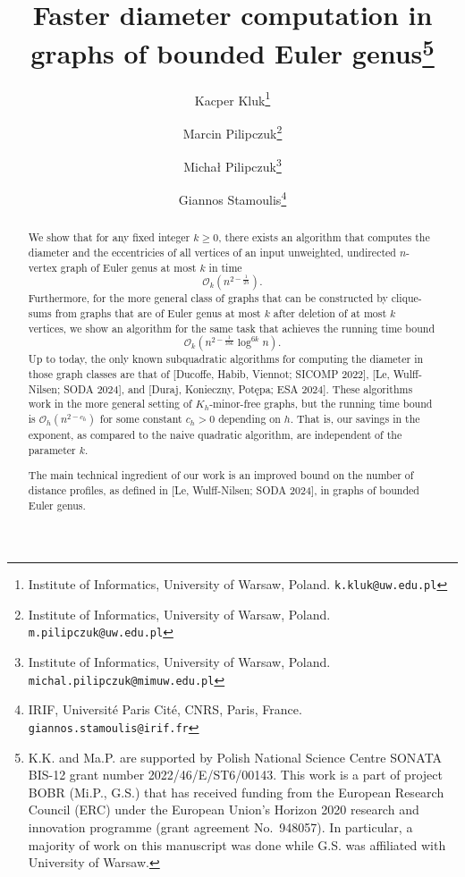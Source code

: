 \documentclass[11pt,a4paper]{article}
\newcommand{\Oh}{\mathcal{O}}
\renewcommand{\geq}{\geqslant}
\begin{document}
\author{
  Kacper Kluk\thanks{Institute of Informatics, University of Warsaw, Poland. \texttt{k.kluk@uw.edu.pl}}
  \and
  Marcin Pilipczuk\thanks{Institute of Informatics, University of Warsaw, Poland. \texttt{m.pilipczuk@uw.edu.pl}}
  \and
  Micha\l{} Pilipczuk\thanks{Institute of Informatics, University of Warsaw, Poland. \texttt{michal.pilipczuk@mimuw.edu.pl}}
  \and
  Giannos Stamoulis\thanks{IRIF, Université Paris Cité, CNRS, Paris, France. \texttt{giannos.stamoulis@irif.fr}}
}


\title{Faster diameter computation in graphs of bounded Euler genus\thanks{
  K.K. and Ma.P. are supported by Polish National Science Centre SONATA BIS-12 grant number 2022/46/E/ST6/00143.
  This work is a part of project BOBR (Mi.P., G.S.) that has received funding from the European Research Council (ERC) 
under the European Union's Horizon 2020 research and innovation programme (grant agreement No.~948057). In particular, a majority of work on this manuscript was done while G.S. was affiliated with University of Warsaw.}}

\date{}

\maketitle

\begin{abstract}
We show that for any fixed integer $k \geq 0$, there exists an algorithm
that computes the diameter and the eccentricies of all vertices of an input
unweighted, undirected $n$-vertex graph of Euler genus at most $k$ in time
 \[ \Oh_k(n^{2-\frac{1}{25}}). \]
Furthermore, for the more general class of graphs
that can be constructed
by clique-sums from graphs that are of Euler genus at most $k$ after deletion
of at most $k$ vertices, we show an algorithm for the same task that achieves the running time bound
 \[ \Oh_k(n^{2-\frac{1}{356}} \log^{6k} n). \]
Up to today, the only known subquadratic algorithms for computing the diameter in those graph classes
are that of [Ducoffe, Habib, Viennot; SICOMP 2022], [Le, Wulff-Nilsen; SODA 2024],
and [Duraj, Konieczny, Pot\k{e}pa; ESA 2024]. These algorithms work
in the more general setting of $K_h$-minor-free graphs,
but the running time bound is $\Oh_h(n^{2-c_h})$ for some constant $c_h > 0$ depending
on $h$. 
That is, our savings in the exponent, as compared to the naive quadratic algorithm, 
are independent of the parameter $k$.

The main technical ingredient of our work is an improved bound on the number of distance
profiles, as defined in [Le, Wulff-Nilsen; SODA 2024], in graphs of bounded Euler genus.
\end{abstract}
\end{document}
